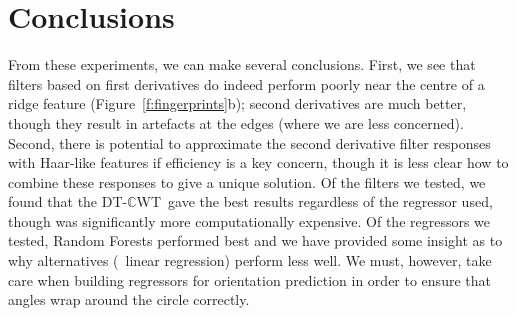 \documentclass[10pt,twocolumn,letterpaper]{article}
\newcommand{\fref}[1]{Figure~\ref{#1}}
\def\dtcwt{DT-$\mathbb{C}$WT}
\begin{document}
\section{Conclusions}
\label{s:conclusions}
From these experiments, we can make several conclusions. First, we see that filters based on first derivatives do indeed perform poorly near the centre of a ridge feature (\fref{f:fingerprints}b); second derivatives are much better, though they result in artefacts at the edges (where we are less concerned). Second, there is potential to approximate the second derivative filter responses with Haar-like features if efficiency is a key concern, though it is less clear how to combine these responses to give a unique solution. Of the filters we tested, we found that the \dtcwt~gave the best results regardless of the regressor used, though was significantly more computationally expensive. Of the regressors we tested, Random Forests performed best and we have provided some insight as to why alternatives (\eg~linear regression) perform less well. We must, however, take care when building regressors for orientation prediction in order to ensure that angles wrap around the circle correctly.


{\small


}
\end{document}
